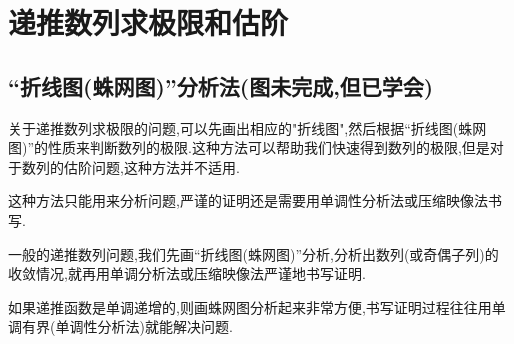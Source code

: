 \documentclass[../../main.tex]{subfiles}
\begin{document}
\section{递推数列求极限和估阶}


\subsection{“折线图(蛛网图)”分析法(图未完成,但已学会)}
关于递推数列求极限的问题,可以先画出相应的"折线图",然后根据“折线图(蛛网图)”的性质来判断数列的极限.这种方法可以帮助我们快速得到数列的极限,但是对于数列的估阶问题,这种方法并不适用.

\begin{remark}
这种方法只能用来分析问题,严谨的证明还是需要用单调性分析法或压缩映像法书写.

一般的递推数列问题,我们先画“折线图(蛛网图)”分析,分析出数列(或奇偶子列)的收敛情况,就再用单调分析法或压缩映像法严谨地书写证明.

如果递推函数是单调递增的,则画蛛网图分析起来非常方便,书写证明过程往往用单调有界(单调性分析法)就能解决问题.
\end{remark}
\end{document}
